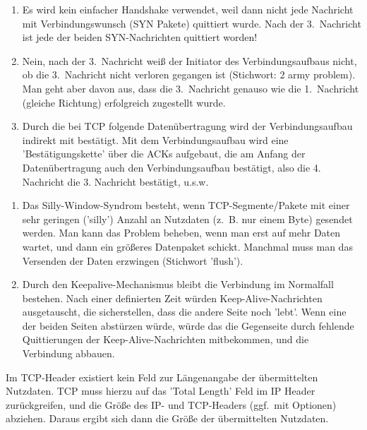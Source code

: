 
\begin{enumerate}
    \item Es wird kein einfacher Handshake verwendet, weil dann nicht jede Nachricht mit Verbindungswunsch (SYN Pakete) quittiert wurde.
    Nach der 3.\ Nachricht ist jede der beiden SYN-Nachrichten quittiert worden!
    \item Nein, nach der 3.\ Nachricht weiß der Initiator des Verbindungsaufbaus nicht, ob die 3.\ Nachricht nicht verloren gegangen ist (Stichwort: 2 army problem).
    Man geht aber davon aus, dass die 3.\ Nachricht genauso wie die 1.\ Nachricht (gleiche Richtung) erfolgreich zugestellt wurde.
    \item Durch die bei TCP folgende Datenübertragung wird der Verbindungsaufbau indirekt mit bestätigt.
    Mit dem Verbindungsaufbau wird eine 'Bestätigungskette' über die ACKs aufgebaut, die am Anfang der Datenübertragung auch den Verbindungsaufbau bestätigt, also die 4. Nachricht die 3. Nachricht bestätigt, u.s.w.
\end{enumerate}

\begin{enumerate}
    \item Das Silly-Window-Syndrom besteht, wenn TCP-Segmente/Pakete mit einer sehr geringen ('silly') Anzahl an Nutzdaten (z.\ B. nur einem Byte) gesendet werden.
    Man kann das Problem beheben, wenn man erst auf mehr Daten wartet, und dann ein größeres Datenpaket schickt.
    Manchmal muss man das Versenden der Daten erzwingen (Stichwort 'flush').
    \item Durch den Keepalive-Mechanismus bleibt die Verbindung im Normalfall bestehen.
    Nach einer definierten Zeit würden Keep-Alive-Nachrichten ausgetauscht, die sicherstellen, dass die andere Seite noch 'lebt'.
    Wenn eine der beiden Seiten abstürzen würde, würde das die Gegenseite durch fehlende Quittierungen der Keep-Alive-Nachrichten mitbekommen, und die Verbindung abbauen.
\end{enumerate}

Im TCP-Header existiert kein Feld zur Längenangabe der übermittelten Nutzdaten.
TCP muss hierzu auf das 'Total Length' Feld im IP Header zurückgreifen, und die Größe des IP- und TCP-Headers (ggf.\ mit Optionen) abziehen.
Daraus ergibt sich dann die Größe der übermittelten Nutzdaten.

